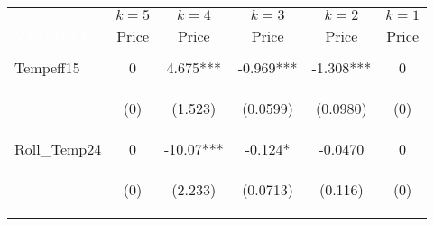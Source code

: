 \begin{center}
\begin{tabular}{lccccc} \toprule
 & $k=5$ & $k=4$ & $k=3$ & $k=2$ & $k=1$\\
\textcolor{white}{VARIABLES} & Price & Price & Price & Price & Price \\ \midrule
\vspace{4pt} & \begin{footnotesize}\end{footnotesize} & \begin{footnotesize}\end{footnotesize} & \begin{footnotesize}\end{footnotesize} & \begin{footnotesize}\end{footnotesize} & \begin{footnotesize}\end{footnotesize} \\
Tempeff15 & 0 & 4.675*** & -0.969*** & -1.308*** & 0 \\
\vspace{4pt} & \begin{footnotesize}(0)\end{footnotesize} & \begin{footnotesize}(1.523)\end{footnotesize} & \begin{footnotesize}(0.0599)\end{footnotesize} & \begin{footnotesize}(0.0980)\end{footnotesize} & \begin{footnotesize}(0)\end{footnotesize} \\
Roll\_Temp24 & 0 & -10.07*** & -0.124* & -0.0470 & 0 \\
\vspace{4pt} & \begin{footnotesize}(0)\end{footnotesize} & \begin{footnotesize}(2.233)\end{footnotesize} & \begin{footnotesize}(0.0713)\end{footnotesize} & \begin{footnotesize}(0.116)\end{footnotesize} & \begin{footnotesize}(0)\end{footnotesize} \\

\end{tabular}
\end{center}
